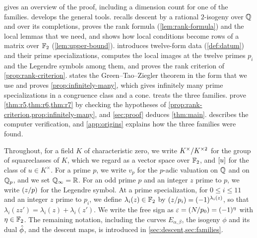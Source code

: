  gives an overview of the proof, including a dimension count for one of the families.  develops the general tools.  recalls descent by a rational $2$-isogeny over $\mathbb Q$ and over its completions, proves the rank formula (\cref{lem:rank-formula}) and the local lemmas that we need, and shows how local conditions become rows of a matrix over $\mathbb F_2$ (\cref{lem:upper-bound}).  introduces twelve-form data (\cref{def:datum}) and their prime specializations, computes the local images at the twelve primes $p_i$ and the Legendre symbols among them, and proves the rank criterion of \cref{prop:rank-criterion}.  states the Green--Tao--Ziegler theorem in the form that we use and proves \cref{prop:infinitely-many}, which gives infinitely many prime specializations in a congruence class and a cone.  treats the three families.  prove \cref{thm:r5,thm:r6,thm:r7} by checking the hypotheses of \cref{prop:rank-criterion,prop:infinitely-many}, and \cref{sec:proof} deduces \cref{thm:main}.  describes the computer verification, and \cref{app:origins} explains how the three families were found.

Throughout, for a field $K$ of characteristic zero, we write $K^{\times}/K^{\times2}$ for the group of squareclasses of $K$, which we regard as a vector space over $\mathbb F_2$, and $[u]$ for the class of $u\in K^\times$. For a prime $p$, we write $v_p$ for the $p$-adic valuation on $\mathbb Q$ and on $\mathbb Q_p$, and we set $\mathbb Q_\infty=\mathbb R$. For an odd prime $p$ and an integer $z$ prime to $p$, we write $\leg zp$ for the Legendre symbol. At a prime specialization, for $0\le i\le 11$ and an integer $z$ prime to $p_i$, we define $\lambda_i(z)\in\mathbb F_2$ by $\leg{z}{p_i}=(-1)^{\lambda_i(z)}$, so that $\lambda_i(zz')=\lambda_i(z)+\lambda_i(z')$. We write the free sign as $\eps=\leg{N}{p_0}=(-1)^\eta$ with $\eta\in\mathbb F_2$. The remaining notation, including the curves $E_{\alpha,\beta}$, the isogeny $\phi$ and its dual $\hat\phi$, and the descent maps, is introduced in \cref{sec:descent,sec:families}.
